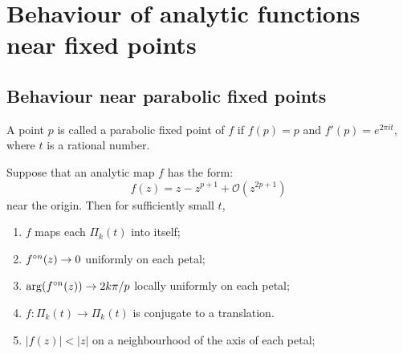 \chapter{Behaviour of analytic functions near fixed points}
\section{Behaviour near parabolic fixed points}
A point \( p \) is called a parabolic fixed point of \( f \)
if \( f(p)=p \) and \( f'(p)=e^{2\pi i t} \), where \( t \)
is a rational number.


\begin{theorem}
Suppose that an analytic map \( f \) has the form:\[
	f(z)=z-z^{p+1}+\mathcal{O}(z^{2p+1})
\] near the origin. Then for sufficiently small \( t \),
\begin{enumerate}
	\item \( f \) maps each \( \Pi_k(t) \) into itself;
	\item \( \fof[n](z)\to 0 \) uniformly on each petal;
	\item \( \arg(\fof[n](z))\to 2k\pi /p \) locally uniformly on each petal;
	\item \( f:\Pi_k(t)\to \Pi_k(t) \) is conjugate to a translation.
	\item \( |f(z)|<|z| \) on a neighbourhood of the axis of each petal;
\end{enumerate}
\end{theorem}

